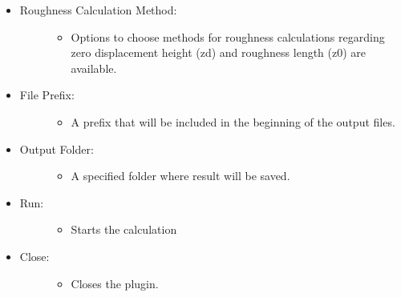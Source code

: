 \documentclass[letterpaper,10pt,english]{sphinxmanual}
\begin{document}
\begin{itemize}
\begin{description}
\begin{itemize}
\end{itemize}

\end{description}

\item {} \begin{description}
\item[{Roughness Calculation Method:}] \leavevmode\begin{itemize}
\item {} 
Options to choose methods for roughness calculations regarding zero displacement height (zd) and roughness length (z0) are available.

\end{itemize}

\end{description}

\item {} \begin{description}
\item[{File Prefix:}] \leavevmode\begin{itemize}
\item {} 
A prefix that will be included in the beginning of the output files.

\end{itemize}

\end{description}

\item {} \begin{description}
\item[{Output Folder:}] \leavevmode\begin{itemize}
\item {} 
A specified folder where result will be saved.

\end{itemize}

\end{description}

\item {} \begin{description}
\item[{Run:}] \leavevmode\begin{itemize}
\item {} 
Starts the calculation

\end{itemize}

\end{description}

\item {} \begin{description}
\item[{Close:}] \leavevmode\begin{itemize}
\item {} 
Closes the plugin.


\end{itemize}
\end{description}
\end{itemize}
\end{document}
